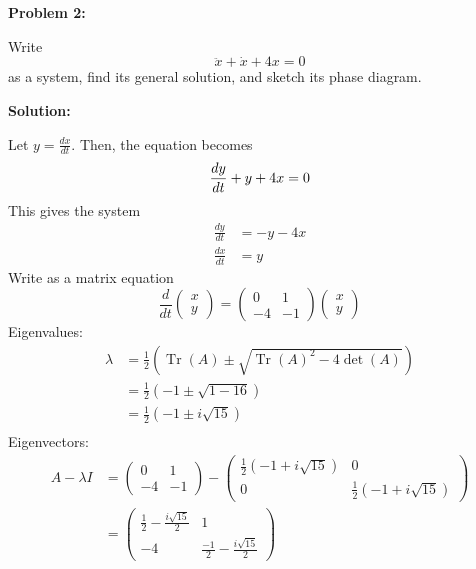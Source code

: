 \documentclass[12pt]{article}
\DeclareMathOperator{\Tr}{Tr}
\newenvironment{problem}[1]{
    \textbf{Problem #1:}
}{
    \rmfamily \vspace{1em}
}
\newenvironment{solution}{
    \textbf{Solution:}
    
}{
    
    \vspace{2em}
}
\begin{document}
\newpage

\begin{problem}{2}
    Write
    \[
        \ddot{x} + \dot{x} + 4x = 0
    \]
    as a system, find its general solution, and sketch its phase diagram.
\end{problem}

\begin{solution}
    Let \(y = \frac{dx}{dt}\). Then, the equation becomes
    \[
        \frac{dy}{dt} + y + 4x = 0 \\
    \]
    This gives the system
    \[
        \begin{aligned} 
            \frac{dy}{dt} &= -y - 4x \\
            \frac{dx}{dt} &= y
        \end{aligned}
    \]
    Write as a matrix equation
    \[
        \frac{d}{dt} \begin{pmatrix} x \\ y \end{pmatrix} = \begin{pmatrix} 0 & 1 \\ -4 & -1 \end{pmatrix} \begin{pmatrix} x \\ y \end{pmatrix}
    \]
    Eigenvalues:
    \[
        \begin{aligned}
            \lambda &= \frac{1}{2}(\Tr(A) \pm \sqrt{\Tr(A)^2 - 4\det(A)}) \\
            &= \frac{1}{2}(-1 \pm \sqrt{1 - 16}) \\
            &= \frac{1}{2}(-1 \pm i\sqrt{15}) \\
        \end{aligned}
    \]
    Eigenvectors:
    \[
        \begin{aligned}
            A - \lambda I &= \begin{pmatrix} 0 & 1 \\ -4 & -1 \end{pmatrix} - \begin{pmatrix} \frac{1}{2}(-1 + i\sqrt{15}) & 0 \\ 0 & \frac{1}{2}(-1 + i\sqrt{15}) \end{pmatrix} \\
            &= \begin{pmatrix} \frac{1}{2} - \frac{i\sqrt{15}}{2} & 1 \\ -4 & \frac{-1}{2} - \frac{i\sqrt{15}}{2} \end{pmatrix}

\end{aligned}\]
\end{solution}
\end{document}
